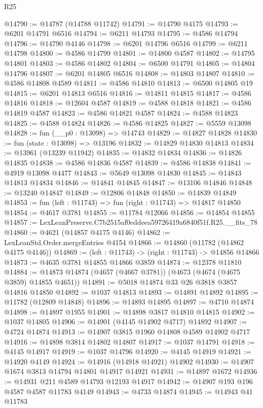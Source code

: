 \begin{lexlean}{R25}
\begin{coremodule}
@14790 := @14787 (@14788 @11742)
@14791 := @14790 @4175
@14793 := @6201 @14791 @6516
@14794 := @6211 @14793
@14795 := @4586 @14794
@14796 := @14790 @4146
@14798 := @6201 @14796 @6516
@14799 := @6211 @14798
@14800 := @4586 @14799
@14801 := @14800 @4587
@14802 := @14795 @14801
@14803 := @4586 @14802
@14804 := @6500 @14791
@14805 := @14804 @14796
@14807 := @6201 @14805 @6516
@14808 := @14803 @14807
@14810 := @4586 @14808 @4589
@14811 := @4586 @14810
@14813 := @6500 @14805 @19
@14815 := @6201 @14813 @6516
@14816 := @14811 @14815
@14817 := @4586 @14816
@14818 := @12604 @4587
@14819 := @4588 @14818
@14821 := @4586 @14819 @4587
@14823 := @4586 @14821 @4587
@14824 := @4588 @14823
@14825 := @4588 @14824
@14826 := @4586 @14825
@14827 := @5559 @13098
@14828 := fun (__p0 : @13098) => @14743
@14829 := @14827 @14828
@14830 := fun (state : @13098) => @13196
@14832 := @14829 @14830 @14813
@14834 := @13961 (@13239 @11942)
@14835 := @14832 @14834
@14836 := @14826 @14835
@14838 := @4586 @14836 @4587
@14839 := @4586 @14838
@14841 := @4919 @13098 @4477
@14843 := @5649 @13098 @14830
@14845 := @14843 @14813 @14834
@14846 := @14841 @14845
@14847 := @13106 @14846
@14848 := @13240 @14847
@14849 := @12806 @14848
@14850 := @14839 @14849
@14853 := fun (left : @11743) => fun (right : @11743) => @14817 @14850
@14854 := @4617 @3781
@14855 := @11784 @12066
@14856 := @14854 @14855
@14857 := LexLeanPreserve.C7b2515af0eddeea59726419a6840f51f.R25.__fits_78
@14860 := @4621 (@14857 @4175 @4146)
@14862 := LexLeanStd.Order.mergeEntries @4154
@14866 := @14860 (@11782 (@14862 @4175 @4146))
@14869 := (left : @11743) -> (right : @11743) -> @14856 @14866
@14873 := @4635 @3781 @14855 @14866 @3859
@14874 := @12378 @11810
@14884 := @14873 @14874 (@4657 (@4667 @3781)) (@4673 (@4674 (@4675 @3859) @14855 @4651))
@14891 := @5018 @14874 @33 @26 @3818 @3857 @14816 @14850
@14892 := @1037 @14813
@14893 := @14891 @14892
@14895 := @11782 (@12809 @14848)
@14896 := @14893 @14895
@14897 := @4710 @14874
@14898 := @14897 @1955
@14901 := @14898 @3817 @14810 @14815
@14902 := @1037 @14805
@14906 := @14901 (@4145 @14902 @4717) @14892
@14907 := @4724 @14874
@14913 := @14907 @3815 @1960 @14808 @4589 @14902 @4717
@14916 := @14898 @3814 @14802 @14807
@14917 := @1037 @14791
@14918 := @4145 @14917
@14919 := @1037 @14796
@14920 := @4145 @14919
@14921 := @14920 @4149
@14924 := @14916 (@14918 @14921) @14902
@14930 := @14907 @1674 @3813 @14794 @14801 @14917 @14921
@14931 := @14897 @1672
@14936 := @14931 @211 @4589 @14793 @12193 @14917
@14942 := @14907 @193 @196 @4587 @4587 @11783 @4149
@14943 := @4733 @14874
@14945 := @14943 @41 @11783

\end{coremodule}
\end{lexlean}

